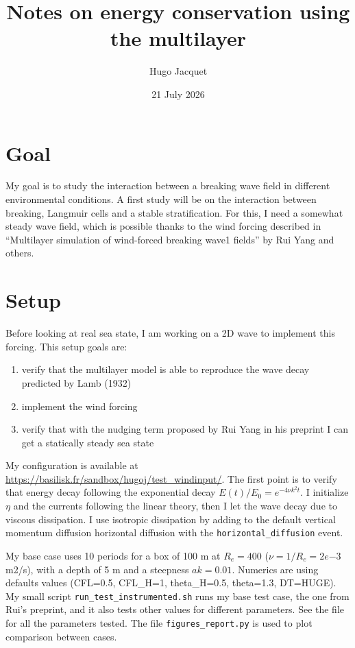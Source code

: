 \documentclass{article}
\title{Notes on energy conservation using the multilayer}
\author{Hugo Jacquet}
\date{21 July 2026}
\begin{document}
\maketitle

\section{Goal}

My goal is to study the interaction between a breaking wave field in different
environmental conditions. A first study will be on the interaction between
breaking, Langmuir cells and a stable stratification. For this, I need a
somewhat steady wave field, which is possible thanks to the wind forcing
described in ``Multilayer simulation of wind-forced breaking wave1
fields'' by Rui Yang and others.

\section{Setup}

Before looking at real sea state, I am working on a 2D wave to implement this
forcing. This setup goals are:
\begin{enumerate}

	\item verify that the multilayer model is able to reproduce the wave decay
	      predicted by Lamb (1932)

	\item implement the wind forcing

	\item verify that with the nudging term proposed by Rui Yang in his preprint I
	      can get a statically steady sea state

\end{enumerate}


My configuration is available at
\url{https://basilisk.fr/sandbox/hugoj/test_windinput/}. The first point is to
verify that energy decay following the exponential decay $E(t)/E_0=e^{-4 \nu k^2
	t}$. I initialize $\eta$ and the currents following the linear theory, then I
let the wave decay due to viscous dissipation. I use isotropic dissipation by
adding to the default vertical momentum diffusion horizontal diffusion with the
\verb|horizontal_diffusion| event.


My base case uses 10 periods for a box of 100 m at $R_e=400$ ($\nu=1/R_e=2e{-3}$
m2/s), with a depth of 5 m and a steepness $ak=0.01$. Numerics are using
defaults values (CFL=0.5, CFL\_H=1, theta\_H=0.5, theta=1.3, DT=HUGE). My small
script \verb|run_test_instrumented.sh| runs my base test case, the one from
Rui's preprint, and it also tests other values for different parameters. See the
file for all the parameters tested. The file \verb|figures_report.py| is used to
plot comparison between cases.
\end{document}
